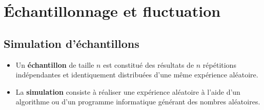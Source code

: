 \chapter{Échantillonnage et fluctuation}

\section{Simulation d'échantillons}

\begin{defin}
	\nline
	\begin{itemize}
		\item Un \textbf{échantillon} de taille $n$ est constitué des résultats de $n$ répétitions indépendantes et identiquement distribuées d'une même expérience aléatoire.
		\item La \textbf{simulation} consiste à réaliser une expérience aléatoire à l'aide d'un algorithme ou d'un programme informatique générant des nombres aléatoires.
	\end{itemize}
\end{defin}

